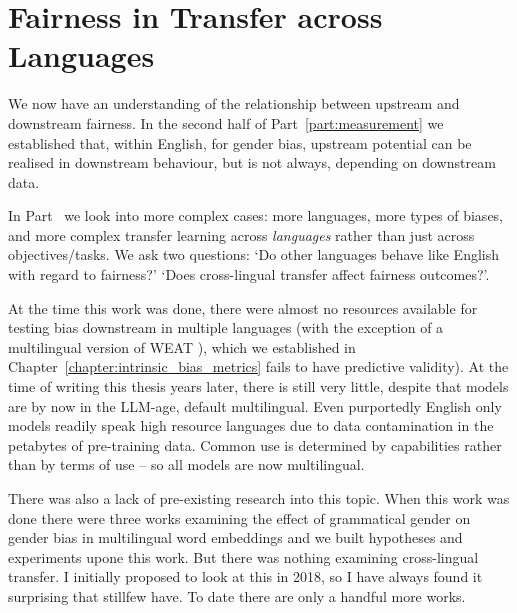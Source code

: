 \part{Fairness in Transfer across Languages}
\label{part:crosslingual}

We now have an understanding of the relationship between upstream and downstream fairness. 
In the second half of Part~\ref{part:measurement} we established that, within English, for gender bias, upstream potential can be realised in downstream behaviour, but is not always, depending on downstream data.

In Part~\ref{part:crosslingual} we look into more complex cases: more languages, more types of biases, and more complex transfer learning across \textit{languages} rather than just across objectives/tasks. We ask two questions: `Do other languages behave like English with regard to fairness?' `Does cross-lingual transfer affect fairness outcomes?'. 

At the time this work was done, there were almost no resources available for testing bias downstream in multiple languages (with the exception of a multilingual version of WEAT \citep{}), which we established in Chapter~\ref{chapter:intrinsic_bias_metrics} fails to have predictive validity). At the time of writing this thesis years later, there is still very little, despite that models are by now in the LLM-age, default multilingual. Even purportedly English only models readily speak high resource languages due to data contamination in the petabytes of pre-training data. Common use is determined by capabilities rather than by terms of use -- so all models are now multilingual.

There was also a lack of pre-existing research into this topic. When this work was done there were three works examining the effect of grammatical gender on gender bias in multilingual word embeddings \citep{} and we built hypotheses and experiments upone this work. But there was nothing examining cross-lingual transfer. I initially proposed to look at this in 2018, so I have always found it surprising that stillfew have. To date there are only a handful more works. 

